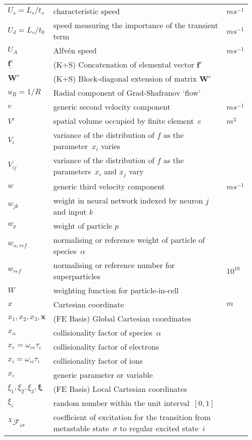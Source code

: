 \begin{longtable}{|p{3.0cm}|p{10.0cm}|p{3.0cm}|}
$U_s =L_s/t_s$ & characteristic speed  & $m s^{-1}$ \\
$U_d =L_s/t_0$ & speed measuring the importance of the transient term  & $m s^{-1}$ \\
$U_A$  & Alfv\'{e}n speed  & $m s^{-1}$ \\
$\underline{\boldsymbol{f}^e}$ &  (K+S) Concatenation of elemental vector $\boldsymbol{f}^e$ & \\
$\underline{\boldsymbol{W}^e}$ &  (K+S) Block-diagonal extension of matrix $\boldsymbol{W}^e$ & \\
$u_R=1/R$ & Radial component of Grad-Shafranov `flow' & \\
$v$ & generic second velocity component  & $m s^{-1}$ \\
$V^e$ & spatial volume occupied by finite element~$e$  & $m^3$ \\
$V_i$ & variance of the distribution of $f$ as the parameter~$x_i$ varies  & \\
$V_{ij}$ & variance of the distribution of $f$ as the parameters~$x_i$ and $x_j$ vary  & \\
$w$ & generic third velocity component  & $m s^{-1}$ \\
$w_{jk}$ & weight in neural network indexed by neuron $j$ and input $k$  & \\
$w_p$ & weight of particle $p$ & \\
$w_{\alpha,ref}$ & normalising or reference weight of particle of species~$\alpha$ & \\
$w_{ref} $ & normalising or reference number for superparticles & $10^{10}$  \\
$W$ & weighting function for particle-in-cell & \\
$x$ & Cartesian coordinate  & $m$ \\
$x_1, x_2, x_3, {\mathbf x}$ &  (FE Basis) Global Cartesian coordinates & \\
$x_\alpha$ & collisionality factor of species~$\alpha$ & \\
$x_e = \omega_{ce}\tau_e$ & collisionality factor of electrons & \\
$x_i = \omega_{ci}\tau_i$ & collisionality factor of ions & \\
$x_i$ & generic parameter or variable  & \\ 
$\xi_1, \xi_2, \xi_3, \boldsymbol{\xi}$ &  (FE Basis) Local Cartesian coordinates & \\
$\xi_i$ & random number within the unit interval~$[0,1]$  & \\
$^X\mathcal{F}_{i\sigma}$ & coefficient of excitation for the transition from metastable state~$\sigma$ to regular excited state~$i$  & \\

\end{longtable}
